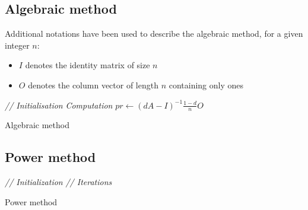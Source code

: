 \documentclass[pdftex,12pt,a4paper]{article}
\begin{document}
\subsection{Algebraic method}
Additional notations have been used to describe the algebraic method, for a given integer $n$:
\begin{itemize}
\item $I$ denotes the identity matrix of size $n$
\item $O$ denotes the column vector of length $n$ containing only ones
\end{itemize}

\IncMargin{1em}
\begin{algorithm}[H]
\BlankLine
\Indm
{}
\Indp
\BlankLine
\emph{// Initialisation}\;
\emph{Computation}\;
$pr\leftarrow \left(dA-I\right)^{-1}\frac{1-d}{n}O$
\BlankLine
\caption{Algebraic method}\label{algebraic_method}
\end{algorithm}
\DecMargin{1em}


\subsection{Power method}
\IncMargin{1em}
\begin{algorithm}[H]
\BlankLine
\Indm
{}
\Indp
\BlankLine
\emph{// Initialization}\;
\emph{// Iterations}\;
\BlankLine
\caption{Power method}\label{algo_power_method}
\end{algorithm}
\DecMargin{1em}
\end{document}
